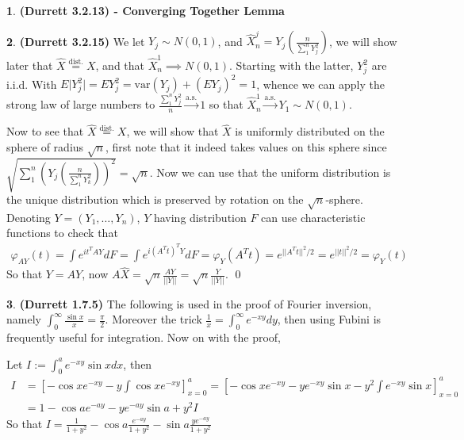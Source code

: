 \documentclass[10.5pt]{article}
\theoremstyle{definition}
\newtheorem{pb}{}
\newcommand{\abs}[1]{\lvert#1\rvert}
\newcommand{\norm}[1]{\lvert\lvert#1\rvert\rvert}
\begin{document}
    \begin{pb}\textbf{(Durrett 3.2.13) - Converging Together Lemma}
        
    \end{pb}
    \begin{pb}\textbf{(Durrett 3.2.15)}
        We let \(Y_j \sim N(0,1)\), and \(\hat{X}^j_n = Y_j(\frac{n}{\sum_1^n Y_j^2})\), we will show later that \(\hat{X} \overset{\text{dist.}}{=} X\), and that \(\hat{X}_n^1 \implies N(0,1)\). Starting with the latter, \(Y_j^2\) are i.i.d. With \(E \abs{Y_j^2} = E Y_j^2 = \text{var}(Y_j) + (E Y_j)^2 = 1\), whence we can apply the strong law of large numbers to \(\frac{\sum_1^n Y_j^2}{n} \overset{\text{a.s.}}{\longrightarrow} 1\) so that \(\hat{X}_n^1 \overset{\text{a.s.}}{\longrightarrow} Y_1 \sim N(0,1)\).

        Now to see that \(\hat{X} \overset{\text{dist.}}{=} X\), we will show that \(\hat{X}\) is uniformly distributed on the sphere of radius \(\sqrt{n}\), first note that it indeed takes values on this sphere since \(\sqrt{\sum_1^n \left(Y_j\left(\frac{n}{\sum_1^n Y_k^2}\right)\right)^2} = \sqrt{n}\). Now we can use that the uniform distribution is the unique distribution which is preserved by rotation on the \(\sqrt{n}\)-sphere. Denoting \(Y = (Y_1,\hdots,Y_n)\), \(Y\) having distribution \(F\) can use characteristic functions to check that
        \begin{align*}
            \varphi_{AY}(t) = \int e^{it^T AY}dF = \int e^{i(A^Tt)^TY}dF = \varphi_Y(A^Tt) = e^{\norm{A^Tt}^2/2} = e^{\norm{t}^2/2} = \varphi_Y(t)
        \end{align*}
        So that \(Y = AY\), now \(A\hat{X} = \sqrt{n}\frac{AY}{\norm{Y}} = \sqrt{n}\frac{Y}{\norm{Y}}\). \qed
    \end{pb}
    \begin{pb} \textbf{(Durrett 1.7.5)}
        The following is used in the proof of Fourier inversion, namely \(\int_0^\infty \frac{\sin x}{x} = \frac{\pi}{2}\). Moreover the trick \(\frac{1}{x} = \int_0^\infty e^{-xy}dy\), then using Fubini is frequently useful for integration. Now on with the proof,

        Let \(I := \int_0^a e^{-xy}\sin x dx\), then
        \begin{align*}
            I &= \left[-\cos x e^{-xy} - y\int \cos x e^{-xy}\right]_{x=0}^a = \left[-\cos x e^{-xy} - ye^{-xy}\sin x - y^2\int e^{-xy}\sin x\right]_{x=0}^a \\
            &= 1 -\cos a e^{-ay} - ye^{-ay}\sin a + y^2 I
        \end{align*}
        So that \(I = \frac{1}{1 + y^2} - \cos a \frac{e^{-ay}}{1 + y^2} - \sin a \frac{ye^{-ay}}{1+y^2}\)
    \end{pb}
\end{document}
